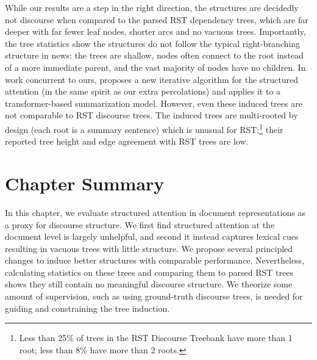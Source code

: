 While our results are a step in the right direction, the structures are decidedly not discourse when compared to the parsed RST dependency trees, which are far deeper with far fewer leaf nodes, shorter arcs and no vacuous trees. Importantly, the tree statistics show the structures do not follow the typical right-branching structure in news: the trees are shallow, nodes often connect to the root instead of a more immediate parent, and the vast majority of nodes have no children. In work concurrent to ours, \citet{Liu:2019} proposes a new iterative algorithm for the structured attention (in the same spirit as our extra percolations) and applies it to a transformer-based summarization model. However, even these induced trees are not comparable to RST discourse trees. The induced trees are multi-rooted by design (each root is a summary sentence) which is unusual for RST;\footnote{Less than 25\% of trees in the RST Discourse Treebank \cite{Carlson:2001} have more than 1 root; less than 8\% have more than 2 roots.} their reported tree height and edge agreement with RST trees are low.

\section{Chapter Summary}
In this chapter, we evaluate structured attention in document representations as a proxy for discourse structure. We first find structured attention at the document level is largely unhelpful, and second it instead captures lexical cues resulting in vacuous trees with little structure. 
We propose several principled changes to induce better structures with comparable performance. Nevertheless, calculating statistics on these trees and comparing them to parsed RST trees shows they still contain no meaningful discourse structure. 
We theorize some amount of supervision, such as using ground-truth discourse trees, is needed for guiding and constraining the tree induction.


